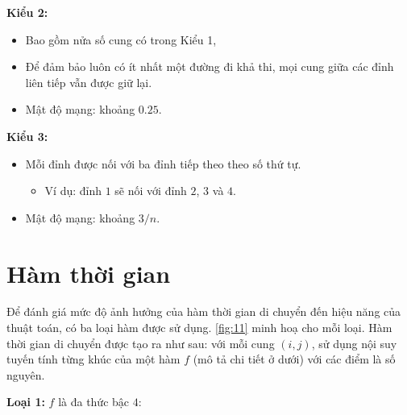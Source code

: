 \documentclass[../main.tex]{subfiles}
\begin{document}
\textbf{Kiểu 2:}

\begin{itemize}
\tightlist
\item
  Bao gồm nửa số cung có trong Kiểu 1,
\item
  Để đảm bảo luôn có ít nhất một đường đi khả thi, mọi cung giữa các
  đỉnh liên tiếp vẫn được giữ lại.
\item
  Mật độ mạng: khoảng \(0.25\).
\end{itemize}

\textbf{Kiểu 3:}

\begin{itemize}
\tightlist
\item
  Mỗi đỉnh được nối với ba đỉnh tiếp theo theo số thứ tự.

  \begin{itemize}
  \tightlist
  \item
    Ví dụ: đỉnh $1$ sẽ nối với đỉnh $2$, $3$ và $4$.
  \end{itemize}
\item
  Mật độ mạng: khoảng \(3/n\).
\end{itemize}



\section{Hàm thời gian}\label{huxe0m-thux1eddi-gian}

Để đánh giá mức độ ảnh hưởng của hàm thời gian di chuyển đến hiệu năng
của thuật toán, có ba loại hàm được sử dụng. \autoref{fig:11} minh hoạ cho mỗi
loại. Hàm thời gian di chuyển được tạo ra như sau: với mỗi cung
\((i,j)\), sử dụng nội suy tuyến tính từng khúc của một hàm \(f\) (mô tả
chi tiết ở dưới) với các điểm là số nguyên.

\textbf{Loại 1:} \(f\) là đa thức bậc $4$:
\end{document}
